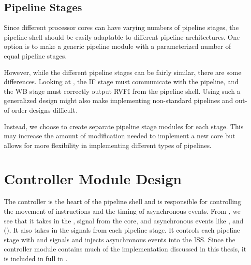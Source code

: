 




\subsection{Pipeline Stages}
Since different processor cores can have varying numbers of pipeline stages, the pipeline shell should be easily adaptable to different pipeline architectures. One option is to make a generic pipeline module with a parameterized number of equal pipeline stages. 

However, while the different pipeline stages can be fairly similar, there are some differences. Looking at , the IF stage must communicate with the pipeline, and the WB stage must correctly output RVFI from the pipeline shell. Using such a generalized design might also make implementing non-standard pipelines and out-of-order designs difficult.

Instead, we choose to create separate pipeline stage modules for each stage. This may increase the amount of modification needed to implement a new core but allows for more flexibility in implementing different types of pipelines.



\section{Controller Module Design}

The controller is the heart of the pipeline shell and is responsible for controlling the movement of instructions and the timing of asynchronous events. From , we see that it takes in the ,  signal from the core, and asynchronous events like , and  (). It also takes in the  signals from each pipeline stage. It controls each pipeline stage with  and  signals and injects asynchronous events into the ISS. Since the controller module contains much of the implementation discussed in this thesis, it is included in full in .

